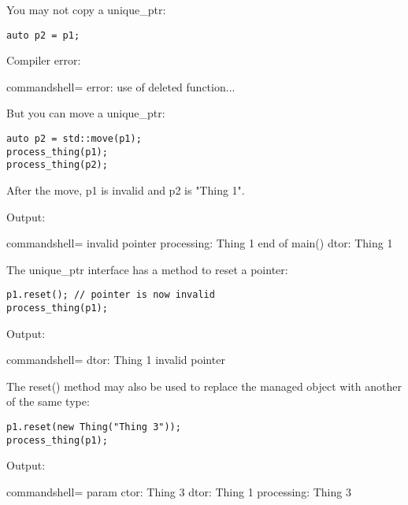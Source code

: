 You may not copy a unique\_ptr:

\begin{lstlisting}[style=styleCXX]
auto p2 = p1;
\end{lstlisting}

Compiler error:

\begin{tcblisting}{commandshell={}}
error: use of deleted function...
\end{tcblisting}

But you can move a unique\_ptr:

\begin{lstlisting}[style=styleCXX]
auto p2 = std::move(p1);
process_thing(p1);
process_thing(p2);
\end{lstlisting}

After the move, p1 is invalid and p2 is "Thing 1".

Output:

\begin{tcblisting}{commandshell={}}
invalid pointer
processing: Thing 1
end of main()
dtor: Thing 1
\end{tcblisting}

The unique\_ptr interface has a method to reset a pointer:

\begin{lstlisting}[style=styleCXX]
p1.reset(); // pointer is now invalid
process_thing(p1);
\end{lstlisting}

Output:

\begin{tcblisting}{commandshell={}}
dtor: Thing 1
invalid pointer
\end{tcblisting}

The reset() method may also be used to replace the managed object with another of the same type:

\begin{lstlisting}[style=styleCXX]
p1.reset(new Thing("Thing 3"));
process_thing(p1);
\end{lstlisting}

Output:

\begin{tcblisting}{commandshell={}}
param ctor: Thing 3
dtor: Thing 1
processing: Thing 3
\end{tcblisting}




















